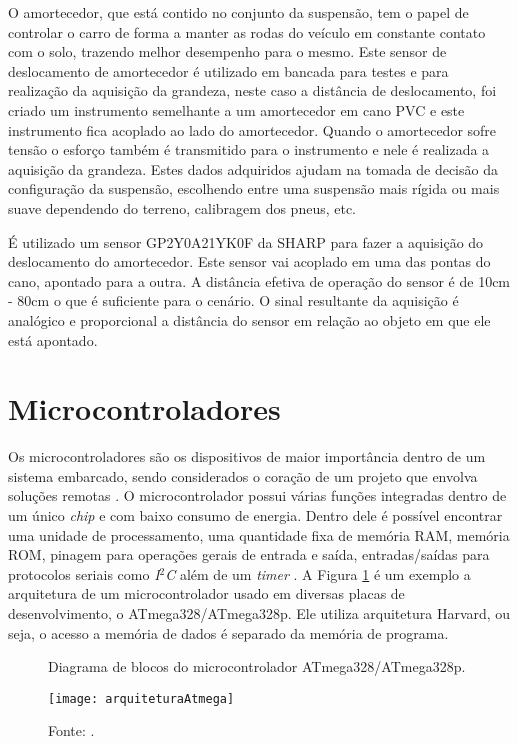 O amortecedor, que está contido no conjunto da suspensão, tem o papel de controlar o carro de forma a manter as rodas do veículo em constante contato com o solo, trazendo melhor desempenho para o mesmo. Este sensor de deslocamento de amortecedor é utilizado em bancada para testes e para realização da aquisição da grandeza, neste caso a distância de deslocamento, foi criado um instrumento semelhante a um amortecedor em cano PVC e este instrumento fica acoplado ao lado do amortecedor. Quando o amortecedor sofre tensão o esforço também é transmitido para o instrumento e nele é realizada a aquisição da grandeza. Estes dados adquiridos ajudam na tomada de decisão da configuração da suspensão, escolhendo entre uma suspensão mais rígida ou mais suave dependendo do terreno, calibragem dos pneus, etc.

É utilizado um sensor GP2Y0A21YK0F da SHARP para fazer a aquisição do deslocamento do amortecedor. Este sensor vai acoplado em uma das pontas do cano, apontado para a outra. A distância efetiva de operação do sensor é de 10cm - 80cm \cite{SHARP} o que é suficiente para o cenário. O sinal resultante da aquisição é analógico e proporcional a distância do sensor em relação ao objeto em que ele está apontado. 

\section{Microcontroladores}
\label{sec:microcontroladores}

Os microcontroladores são os dispositivos de maior importância dentro de um sistema embarcado, sendo considerados o coração de um projeto que envolva soluções remotas \cite{aSurveyTo2010}. O microcontrolador possui várias funções integradas dentro de um único \textit{chip} e com baixo consumo de energia. Dentro dele é possível encontrar uma unidade de processamento, uma quantidade fixa de memória RAM, memória ROM, pinagem para operações gerais de entrada e saída, entradas/saídas para protocolos seriais como \textit{I$^2$C} além de um \textit{timer} \cite{mazidi2008pic}. A Figura \ref{fig:arquiteturaAtmega} é um exemplo a arquitetura de um microcontrolador usado em diversas placas de desenvolvimento, o ATmega328/ATmega328p. Ele utiliza arquitetura Harvard, ou seja, o acesso a memória de dados é separado da memória de programa.        


\begin{figure}[!htb]
	\centering
		\caption{Diagrama de blocos do microcontrolador ATmega328/ATmega328p.}
		\texttt{[image: arquiteturaAtmega]} 
		\caption*{Fonte: \cite{atmel}.}
		\label{fig:arquiteturaAtmega}
\end{figure} 

